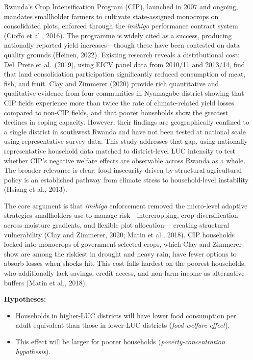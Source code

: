 \documentclass[11pt]{article}
\begin{document}
Rwanda's Crop Intensification Program (CIP), launched in 2007 and ongoing,
mandates smallholder farmers to cultivate state-assigned monocrops on
consolidated plots, enforced through the \textit{imihigo} performance
contract system (Cioffo et al., 2016). The programme is widely cited as a
success, producing nationally reported yield increases---though these have
been contested on data quality grounds (Heinen, 2022). Existing research
reveals a distributional cost: Del~Prete et al.\ (2019), using EICV panel
data from 2010/11 and 2013/14, find that land consolidation participation
significantly reduced consumption of meat, fish, and fruit. Clay and Zimmerer
(2020) provide rich quantitative and qualitative evidence from four communities
in Nyamagabe district showing that CIP fields experience more than twice the
rate of climate-related yield losses compared to non-CIP fields, and that
poorer households show the greatest declines in coping capacity. However,
their findings are geographically confined to a single district in southwest
Rwanda and have not been tested at national scale using representative survey
data. This study addresses that gap, using nationally representative household
data matched to district-level LUC intensity to test whether CIP's negative
welfare effects are observable across Rwanda as a whole. The broader relevance
is clear: food insecurity driven by structural agricultural policy is an
established pathway from climate stress to household-level instability
(Hsiang et al., 2013).

\vspace{0.3cm}
The core argument is that \textit{imihigo} enforcement removed the micro-level
adaptive strategies smallholders use to manage risk---intercropping, crop
diversification across moisture gradients, and flexible plot allocation---
creating structural vulnerability (Clay and Zimmerer, 2020; Matin et al.,
2018). CIP households locked into monocrops of government-selected crops,
which Clay and Zimmerer show are among the riskiest in drought and heavy
rain, have fewer options to absorb losses when shocks hit. This cost falls
hardest on the poorest households, who additionally lack savings, credit
access, and non-farm income as alternative buffers (Matin et al., 2018).

\vspace{0.3cm}
\noindent \textbf{Hypotheses:}
\begin{itemize}[noitemsep, topsep=2pt]
    \item[\textbf{H1}] Households in higher-LUC districts will have lower
          food consumption per adult equivalent than those in lower-LUC
          districts (\textit{food welfare effect}).
    \item[\textbf{H2}] This effect will be larger for poorer households
          (\textit{poverty-concentration hypothesis}).
\end{itemize}
\end{document}
